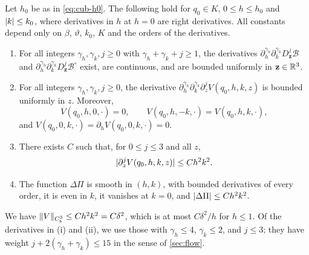 \begin{lemma}\label{b:lem:os-flow}
Let $h_0$ be as in \eqref{eq:cub-h0}. The following hold for $q_0\in K$,
$0\le h\le h_0$ and $\lvert k\rvert\le k_0$, where derivatives in $h$ at $h=0$ are
right derivatives. All constants depend only on $\beta$, $\vartheta$, $k_0$, $K$
and the orders of the derivatives.
\begin{enumerate}[label=\textup{(\roman*)}]
\item For all integers $\gamma_h,\gamma_k,j\ge0$ with $\gamma_h+\gamma_k+j\ge1$, the derivatives
 $\partial_h^{\gamma_h}\partial_k^{\gamma_k}D_{\mathbf z}^j\mathcal B$ and
 $\partial_h^{\gamma_h}\partial_k^{\gamma_k}D_{\mathbf z}^j\mathcal B^\circ$ exist, are continuous,
 and are bounded uniformly in $\mathbf z\in\mathbb R^3$.
\item For all integers $\gamma_h,\gamma_k,j\ge0$, the derivative
 $\partial_h^{\gamma_h}\partial_k^{\gamma_k}\partial_z^jV(q_0,h,k,z)$ is bounded uniformly in $z$.
 Moreover,
 \[
  V(q_0,h,0,\cdot)=0,\qquad V(q_0,h,-k,\cdot)=V(q_0,h,k,\cdot),
 \]
 and $V(q_0,0,k,\cdot)=\partial_hV(q_0,0,k,\cdot)=0$.
\item There exists $C$ such that, for $0\le j\le3$ and all $z$,
 \begin{equation}\label{b:eq:os-V-bound}
  \lvert \partial_z^jV(q_0,h,k,z)\rvert\le Ch^2k^2.
 \end{equation}
\item The function $\Delta\Pi$ is smooth in $(h,k)$, with bounded derivatives of
 every order, it is even in $k$, it vanishes at $k=0$, and
 $\lvert \Delta\Pi\rvert\le Ch^2k^2$.
\end{enumerate}
\end{lemma}

We have $\lVert V\rVert_{C^3_b}\le Ch^2k^2=C\delta^2$, which is at most
$C\delta^2/h$ for $h\le1$. Of the derivatives in (i) and (ii), we use those with
$\gamma_h\le4$, $\gamma_k\le2$, and $j\le3$; they have weight $j+2(\gamma_h+\gamma_k)\le15$ in the sense of
\cref{sec:flow}.

